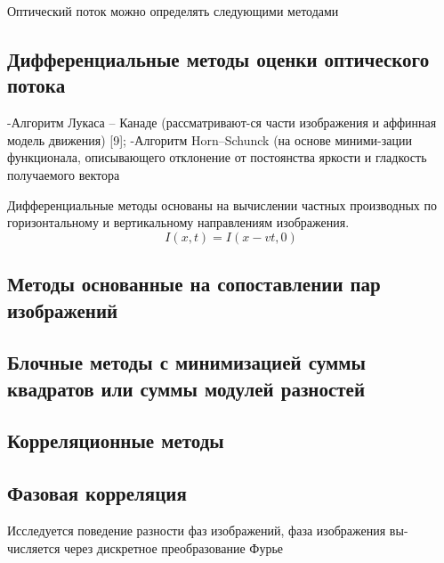 Оптический поток можно определять следующими методами
\subsection{Дифференциальные методы оценки оптического потока} 
-Алгоритм Лукаса – Канаде (рассматривают-ся части изображения и аффинная модель движения) [9];
-Алгоритм Horn–Schunck (на основе миними-зации функционала, описывающего  отклонение от постоянства яркости и гладкость получаемого вектора

Дифференциальные методы основаны на вычислении частных производных по горизонтальному и вертикальному направлениям изображения. 
\begin{equation}
I(x,t) = I ( x - vt, 0)
\end{equation}
\subsection{Методы основанные на сопоставлении пар изображений}
\subsection{Блочные  методы  с  минимизацией  суммы квадратов или суммы модулей разностей}
\subsection{Корреляционные методы}
\subsection{Фазовая корреляция} 
Исследуется поведение разности фаз изображений, фаза изображения  вы-числяется через дискретное преобразование Фурье
